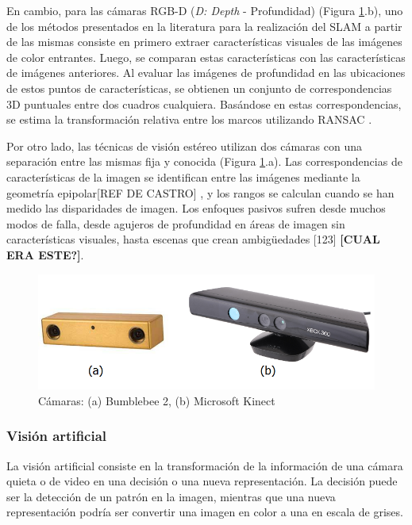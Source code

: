 En cambio, para las cámaras RGB-D (\textit{D: Depth} - Profundidad) (Figura \ref{fig:camaras}.b), uno de los métodos presentados en la literatura para la realización del SLAM a partir de las mismas \cite{endres2012} consiste en primero extraer características visuales de las imágenes de color entrantes. Luego, se comparan estas características con las características de imágenes anteriores. Al evaluar las imágenes de profundidad en las ubicaciones de estos puntos de características, se obtienen un conjunto de correspondencias 3D puntuales entre dos cuadros cualquiera. Basándose en estas correspondencias, se estima la transformación relativa entre los marcos utilizando RANSAC \cite{trivedi2013}.

Por otro lado, las técnicas de visión estéreo utilizan dos cámaras con una separación entre las mismas fija y conocida (Figura \ref{fig:camaras}.a). Las correspondencias de características de la imagen se identifican entre las imágenes mediante la geometría epipolar[REF DE CASTRO] \cite{kaehler2017}, y los rangos se calculan cuando se han medido las disparidades de imagen. Los enfoques pasivos sufren desde muchos modos de falla, desde agujeros de profundidad en áreas de imagen sin características visuales, hasta escenas que crean ambigüedades [123] \textbf{[CUAL ERA ESTE?]}.

\begin{figure}
    \centering
    \includegraphics[width=.9\linewidth]{Img/bumblekinect}
    \caption{Cámaras: (a) Bumblebee 2, (b) Microsoft Kinect}
    \label{fig:camaras}
\end{figure}

\subsubsection{Visión artificial}
La visión artificial consiste en la transformación de la información de una cámara quieta o de video en una decisión o una nueva representación. La decisión puede ser la detección de un patrón en la imagen, mientras que una nueva representación podría ser convertir una imagen en color a una en escala de grises.

